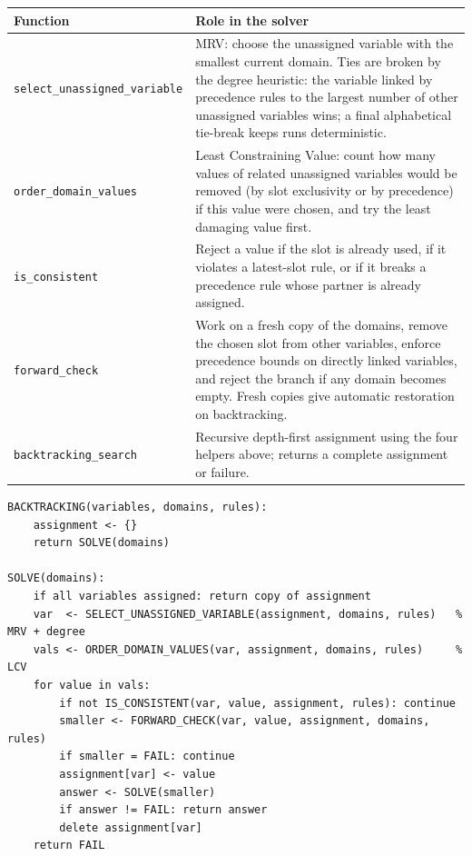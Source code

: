 \documentclass[11pt,a4paper]{article}
\newcommand{\code}[1]{\texttt{#1}}
\begin{document}
\begin{center}
\footnotesize
\begin{tabular}{@{}p{4.6cm}p{11.1cm}@{}}
\toprule
Function & Role in the solver \\
\midrule
\code{select\_unassigned\_variable} & MRV: choose the unassigned variable with the smallest
current domain. Ties are broken by the degree heuristic: the variable linked by precedence
rules to the largest number of other unassigned variables wins; a final alphabetical tie-break
keeps runs deterministic. \\
\code{order\_domain\_values} & Least Constraining Value: count how many values of related
unassigned variables would be removed (by slot exclusivity or by precedence) if this value
were chosen, and try the least damaging value first. \\
\code{is\_consistent} & Reject a value if the slot is already used, if it violates a latest-slot
rule, or if it breaks a precedence rule whose partner is already assigned. \\
\code{forward\_check} & Work on a fresh copy of the domains, remove the chosen slot from other
variables, enforce precedence bounds on directly linked variables, and reject the branch if any
domain becomes empty. Fresh copies give automatic restoration on backtracking. \\
\code{backtracking\_search} & Recursive depth-first assignment using the four helpers above;
returns a complete assignment or failure. \\
\bottomrule
\end{tabular}
\end{center}

\begin{verbatim}
BACKTRACKING(variables, domains, rules):
    assignment <- {}
    return SOLVE(domains)

SOLVE(domains):
    if all variables assigned: return copy of assignment
    var  <- SELECT_UNASSIGNED_VARIABLE(assignment, domains, rules)   % MRV + degree
    vals <- ORDER_DOMAIN_VALUES(var, assignment, domains, rules)     % LCV
    for value in vals:
        if not IS_CONSISTENT(var, value, assignment, rules): continue
        smaller <- FORWARD_CHECK(var, value, assignment, domains, rules)
        if smaller = FAIL: continue
        assignment[var] <- value
        answer <- SOLVE(smaller)
        if answer != FAIL: return answer
        delete assignment[var]
    return FAIL
\end{verbatim}
\end{document}

